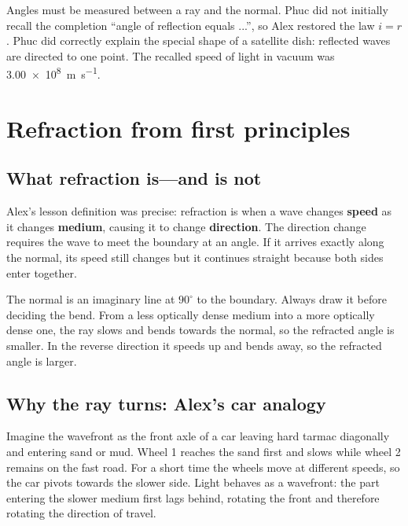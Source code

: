 \documentclass[11pt,a4paper]{article}
\newcommand{\term}[1]{\textbf{#1}}
\begin{document}
Angles must be measured between a ray and the normal. Phuc did not initially recall the completion ``angle of reflection equals ...'', so Alex restored the law $i=r$. Phuc did correctly explain the special shape of a satellite dish: reflected waves are directed to one point. The recalled speed of light in vacuum was \SI{3.00e8}{\metre\per\second}.

\section{Refraction from first principles}
\subsection{What refraction is---and is not}
Alex's lesson definition was precise: refraction is when a wave changes \term{speed} as it changes \term{medium}, causing it to change \term{direction}. The direction change requires the wave to meet the boundary at an angle. If it arrives exactly along the normal, its speed still changes but it continues straight because both sides enter together.

The normal is an imaginary line at $90^\circ$ to the boundary. Always draw it before deciding the bend. From a less optically dense medium into a more optically dense one, the ray slows and bends towards the normal, so the refracted angle is smaller. In the reverse direction it speeds up and bends away, so the refracted angle is larger.

\begin{center}
\end{center}

\subsection{Why the ray turns: Alex's car analogy}
Imagine the wavefront as the front axle of a car leaving hard tarmac diagonally and entering sand or mud. Wheel 1 reaches the sand first and slows while wheel 2 remains on the fast road. For a short time the wheels move at different speeds, so the car pivots towards the slower side. Light behaves as a wavefront: the part entering the slower medium first lags behind, rotating the front and therefore rotating the direction of travel.
\end{document}
